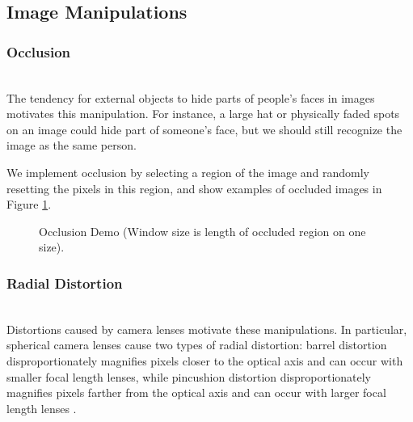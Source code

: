 \documentclass[pageno]{cos429}
\begin{document}
\subsection{Image Manipulations}

\subsubsection{Occlusion}\hspace*{\fill} \\
The tendency for external objects to hide parts of people's faces in images motivates this manipulation. For instance, a large hat or physically faded spots on an image could hide part of someone's face, but we should still recognize the image as the same person.

We implement occlusion by selecting a region of the image and randomly resetting the pixels in this region, and show examples of occluded images in Figure \ref{fig:manipulationdemo_occlusion}.

\begin{figure}[!htb]
\caption{Occlusion Demo (Window size is length of occluded region on one size).}
\label{fig:manipulationdemo_occlusion}
\end{figure}

\subsubsection{Radial Distortion}\hspace*{\fill} \\
Distortions caused by camera lenses motivate these manipulations. In particular, spherical camera lenses cause two types of radial distortion: barrel distortion disproportionately magnifies pixels closer to the optical axis and can occur with smaller focal length lenses, while pincushion distortion disproportionately magnifies pixels farther from the optical axis and can occur with larger focal length lenses \cite{drap_exact_2016}.
\end{document}
